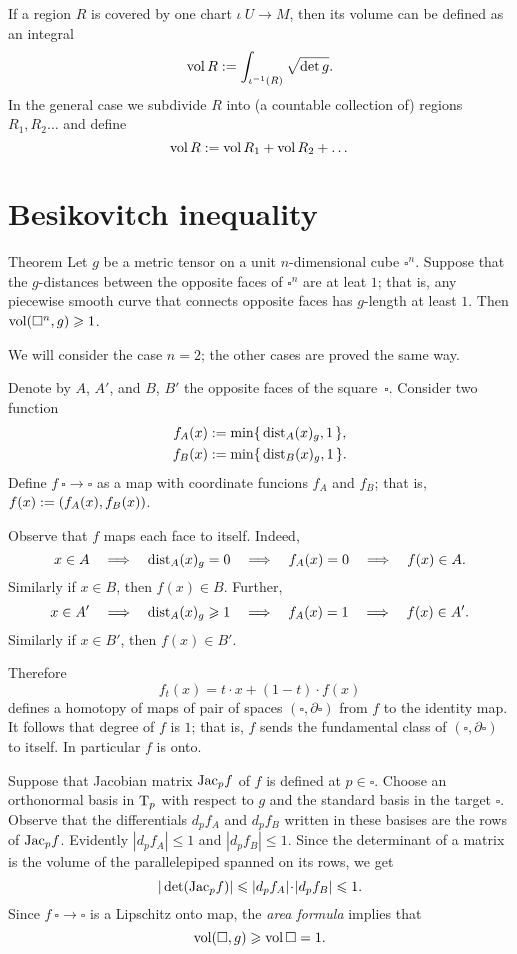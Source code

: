 If a region $R$ is covered by one chart $\iota\:U\to M$,
then its volume can be defined as an integral 
\[\operatorname{\rm vol}\nolimits R
\mathrel{:=}
\int_{\iota^{-1}(R)}\sqrt{\det{g}}.\]
In the general case we subdivide $R$ into (a countable collection of) regions $R_1,R_2\dots$ and define
\[\operatorname{\rm vol}\nolimits R\mathrel{:=} \operatorname{\rm vol}\nolimits R_1+\operatorname{\rm vol}\nolimits R_2+\dots\]

\section{Besikovitch inequality}

\begin{thm}{Theorem}\label{thm:besikovitch}
Let $g$ be a metric tensor on a unit $n$-dimensional cube $\square^n$.
Suppose that the $g$-distances between the opposite faces of $\square^n$ are at leat $1$; that is, any piecewise smooth curve that connects opposite faces has $g$-length at least $1$.
Then $\operatorname{\rm vol}\nolimits(\square^n, g)\geqslant 1$.
\end{thm}

We will consider the case $n=2$; the other cases are proved the same way.

Denote by $A$, $A'$, and $B$, $B'$ the opposite faces of the square~$\square$.
Consider two function 
\begin{align*}
f_A(x)&\mathrel{:=}\min\{\,\mathrm{dist}_A(x)_g,1\,\},
\\
f_B(x)&\mathrel{:=}\min\{\,\mathrm{dist}_B(x)_g,1\,\}.
\end{align*}
Define $f\:\square\to\square$ as a map with coordinate funcions $f_A$ and $f_B$;
that is, $f(x)\mathrel{:=}(f_A(x), f_B(x))$.

Observe that $f$ maps each face to itself.
Indeed, 
\[x\in A \quad\Longrightarrow\quad \mathrm{dist}_A(x)_g=0 \quad\Longrightarrow\quad f_A(x)=0 \quad\Longrightarrow\quad f(x)\in A.\]
Similarly if $x\in B$, then $f(x)\in B$.
Further, 
\[x\in A'
\quad\Longrightarrow\quad 
\mathrm{dist}_A(x)_g\geqslant 1 
\quad\Longrightarrow\quad 
f_A(x)=1 
\quad\Longrightarrow\quad 
f(x)\in A'.\]
Similarly if $x\in B'$, then $f(x)\in B'$.

Therefore 
\[f_t(x)= t\cdot x + (1-t)\cdot f(x)\]
defines a homotopy of maps of pair of spaces $(\square,\partial \square)$ from $f$ to the identity map.
It follows that degree of $f$ is $1$; that is, $f$ sends the fundamental class of $(\square,\partial \square)$ to itself.
In particular $f$ is onto.

Suppose that Jacobian  matrix $\mathrm{Jac}_pf$ of $f$ is defined at $p\in \square$.
Choose an orthonormal basis in $\mathrm{T}_p$ with respect to $g$ and the standard basis in the target $\square$.
Observe that the differentials $d_pf_A$ and $d_pf_B$ written in these basises are the rows of $\mathrm{Jac}_pf$.
Evidently $|d_pf_A|\le 1$ and $|d_pf_B|\le 1$.
Since the determinant of a matrix is the volume of the parallelepiped spanned on its rows, we get 
\[|\det(\Jac_pf)|\le |d_pf_A|\cdot|d_pf_B|\le 1.\]
Since $f\:\square\to\square$ is a Lipschitz onto map, the {}\emph{area formula} implies that 
\[\operatorname{\rm vol}\nolimits(\square,g)\geqslant \operatorname{\rm vol}\nolimits\square=1.\]
\qedsf



